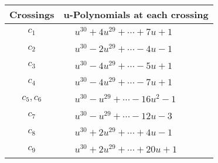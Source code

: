 \documentclass[1p]{elsarticle_modified}
\theoremstyle{definition}
\begin{document}
\begin{tabular}{m{50pt}|m{274pt}}
Crossings & \hspace{64pt}u-Polynomials at each crossing \\
\hline $$\begin{aligned}c_{1}\end{aligned}$$&$\begin{aligned}
&u^{30}+4 u^{29}+\cdots+7 u+1
\end{aligned}$\\
\hline $$\begin{aligned}c_{2}\end{aligned}$$&$\begin{aligned}
&u^{30}-2 u^{29}+\cdots-4 u-1
\end{aligned}$\\
\hline $$\begin{aligned}c_{3}\end{aligned}$$&$\begin{aligned}
&u^{30}-4 u^{29}+\cdots-5 u+1
\end{aligned}$\\
\hline $$\begin{aligned}c_{4}\end{aligned}$$&$\begin{aligned}
&u^{30}-4 u^{29}+\cdots-7 u+1
\end{aligned}$\\
\hline $$\begin{aligned}c_{5},c_{6}\end{aligned}$$&$\begin{aligned}
&u^{30}- u^{29}+\cdots-16 u^2-1
\end{aligned}$\\
\hline $$\begin{aligned}c_{7}\end{aligned}$$&$\begin{aligned}
&u^{30}- u^{29}+\cdots-12 u-3
\end{aligned}$\\
\hline $$\begin{aligned}c_{8}\end{aligned}$$&$\begin{aligned}
&u^{30}+2 u^{29}+\cdots+4 u-1
\end{aligned}$\\
\hline $$\begin{aligned}c_{9}\end{aligned}$$&$\begin{aligned}
&u^{30}+2 u^{29}+\cdots+20 u+1
\end{aligned}$\\

\end{tabular}
\end{document}
